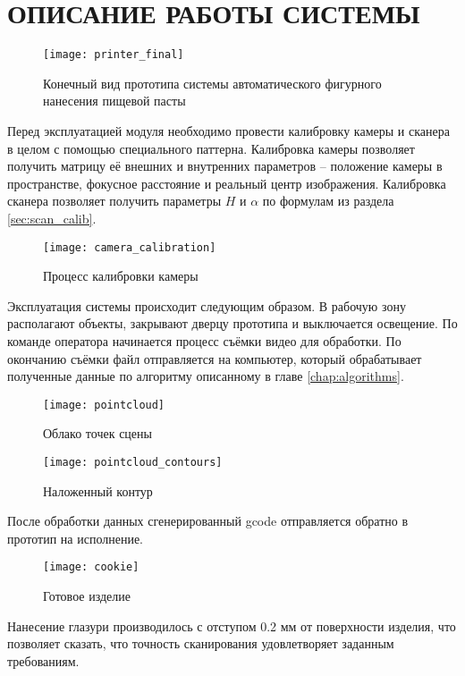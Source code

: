 \chapter{ОПИСАНИЕ РАБОТЫ СИСТЕМЫ}
    \begin{figure}[H]
        \centering
        \texttt{[image: printer\_final]}\\
        \caption{Конечный вид прототипа системы автоматического фигурного нанесения пищевой пасты}
    \end{figure}

    Перед эксплуатацией модуля необходимо провести калибровку камеры и сканера в целом с помощью специального паттерна. Калибровка камеры позволяет получить матрицу её внешних и внутренних параметров -- положение камеры в пространстве, фокусное расстояние и реальный центр изображения.
    Калибровка сканера позволяет получить параметры $ H $ и $ \alpha $ по формулам из раздела \ref{sec:scan_calib}. 
    
    \begin{figure}[H]
        \centering
        \texttt{[image: camera\_calibration]}
        \caption{Процесс калибровки камеры}
    \end{figure}
    
    Эксплуатация системы происходит следующим образом. В рабочую зону располагают объекты, закрывают дверцу прототипа и выключается освещение. По команде оператора начинается процесс съёмки видео для обработки. По окончанию съёмки файл отправляется на компьютер, который обрабатывает полученные данные по алгоритму описанному в главе \ref{chap:algorithms}.
    
    \begin{figure}[H]
        \centering
        \texttt{[image: pointcloud]}
        \caption{Облако точек сцены}
    \end{figure}
    \begin{figure}[H]
        \centering
        \texttt{[image: pointcloud\_contours]}
        \caption{Наложенный контур}
    \end{figure}
    
    После обработки данных сгенерированный gcode отправляется обратно в прототип на исполнение.
    
    \begin{figure}[H]
        \centering
        \texttt{[image: cookie]}
        \caption{Готовое изделие}
    \end{figure}
    
    Нанесение глазури производилось с отступом 0.2 мм от поверхности изделия, что позволяет сказать, что точность сканирования удовлетворяет заданным требованиям. 